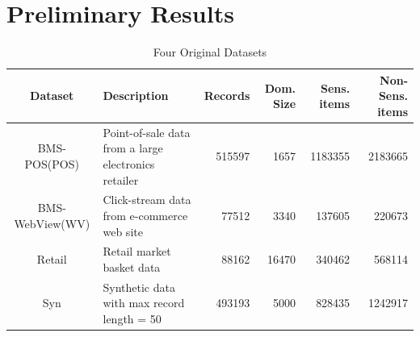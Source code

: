 \section{Preliminary Results}
\label{sec:eval}
\begin{table}[th]
\caption{Four Original Datasets}
\centering
\begin{tabular}{|c|l|r|r|r|r|} \hline
Dataset	& Description & Records & Dom. Size & Sens. items & Non-Sens. items  \\ \hline \hline
BMS-POS(POS) &Point-of-sale data from a large electronics retailer    &515597 & 1657&1183355 &  2183665\\ \hline
BMS-WebView(WV) &Click-stream data from e-commerce web site  &77512 & 3340& 137605 & 220673  \\ \hline
Retail &  Retail market basket data   & 88162&16470 &340462 & 568114  \\ \hline
Syn & Synthetic data with max record length = 50   & 493193 &5000 &828435 & 1242917 \\ \hline
\end{tabular}
\label{tab:datasets}
\end{table}



